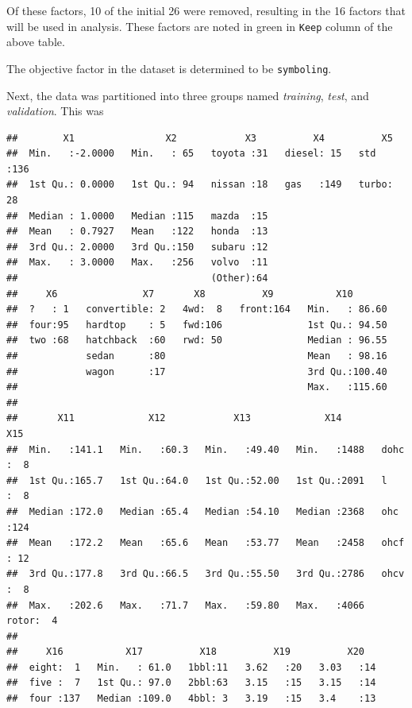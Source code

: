 \documentclass[12pt,openany]{book}
\begin{document}
Of these factors, 10 of the initial 26 were removed, resulting in the 16
factors that will be used in analysis. These factors are noted in green
in \texttt{Keep} column of the above table.

The objective factor in the dataset is determined to be
\texttt{symboling}.

Next, the data was partitioned into three groups named \emph{training},
\emph{test}, and \emph{validation}. This was

\begin{verbatim}
##        X1                X2            X3          X4          X5     
##  Min.   :-2.0000   Min.   : 65   toyota :31   diesel: 15   std  :136  
##  1st Qu.: 0.0000   1st Qu.: 94   nissan :18   gas   :149   turbo: 28  
##  Median : 1.0000   Median :115   mazda  :15                           
##  Mean   : 0.7927   Mean   :122   honda  :13                           
##  3rd Qu.: 2.0000   3rd Qu.:150   subaru :12                           
##  Max.   : 3.0000   Max.   :256   volvo  :11                           
##                                  (Other):64                           
##     X6               X7       X8          X9           X10        
##  ?   : 1   convertible: 2   4wd:  8   front:164   Min.   : 86.60  
##  four:95   hardtop    : 5   fwd:106               1st Qu.: 94.50  
##  two :68   hatchback  :60   rwd: 50               Median : 96.55  
##            sedan      :80                         Mean   : 98.16  
##            wagon      :17                         3rd Qu.:100.40  
##                                                   Max.   :115.60  
##                                                                   
##       X11             X12            X13             X14          X15     
##  Min.   :141.1   Min.   :60.3   Min.   :49.40   Min.   :1488   dohc :  8  
##  1st Qu.:165.7   1st Qu.:64.0   1st Qu.:52.00   1st Qu.:2091   l    :  8  
##  Median :172.0   Median :65.4   Median :54.10   Median :2368   ohc  :124  
##  Mean   :172.2   Mean   :65.6   Mean   :53.77   Mean   :2458   ohcf : 12  
##  3rd Qu.:177.8   3rd Qu.:66.5   3rd Qu.:55.50   3rd Qu.:2786   ohcv :  8  
##  Max.   :202.6   Max.   :71.7   Max.   :59.80   Max.   :4066   rotor:  4  
##                                                                           
##     X16           X17          X18          X19          X20    
##  eight:  1   Min.   : 61.0   1bbl:11   3.62   :20   3.03   :14  
##  five :  7   1st Qu.: 97.0   2bbl:63   3.15   :15   3.15   :14  
##  four :137   Median :109.0   4bbl: 3   3.19   :15   3.4    :13  

\end{verbatim}
\end{document}
